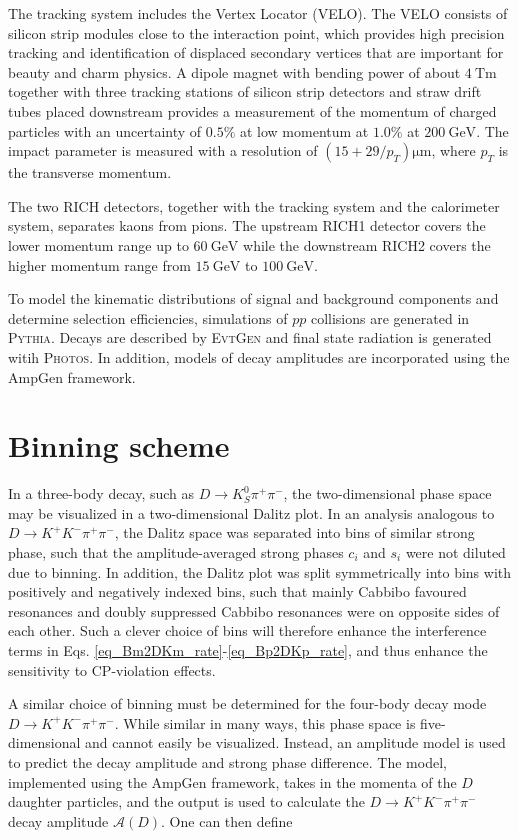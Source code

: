 \documentclass[12pt, a4paper, notitlepage, onecolumn]{article}
\def\pythia{\mbox{\textsc{Pythia}}\xspace}
\def\evtgen{\mbox{\textsc{EvtGen}}\xspace}
\def\photos{\mbox{\textsc{Photos}}\xspace}
\numberwithin{equation}{section}
\begin{document}
The tracking system includes the Vertex Locator (VELO). The VELO consists of silicon strip modules close to the interaction point, which provides high precision tracking and identification of displaced secondary vertices that are important for beauty and charm physics. A dipole magnet with bending power of about $\SI{4}{\tesla\meter}$ together with three tracking stations of silicon strip detectors and straw drift tubes placed downstream provides a measurement of the momentum of charged particles with an uncertainty of $0.5\%$ at low momentum at $1.0\%$ at $\SI{200}{\giga\eV}$. The impact parameter is measured with a resolution of $(15 + 29/p_T)\si{\micro\meter}$, where $p_T$ is the transverse momentum.

The two RICH detectors, together with the tracking system and the calorimeter system, separates kaons from pions. The upstream RICH1 detector covers the lower momentum range up to $\SI{60}{\giga\eV}$ while the downstream RICH2 covers the higher momentum range from $\SI{15}{\giga\eV}$ to $\SI{100}{\giga\eV}$.

To model the kinematic distributions of signal and background components and determine selection efficiencies, simulations of $pp$ collisions are generated in \pythia. Decays are described by \evtgen and final state radiation is generated witih \photos. In addition, models of decay amplitudes are incorporated using the AmpGen framework.

\section{Binning scheme}
\noindent In a three-body decay, such as $D\to K_S^0\pi^+\pi^-$, the two-dimensional phase space may be visualized in a two-dimensional Dalitz plot. In an analysis analogous to $D\to K^+K^-\pi^+\pi^-$, the Dalitz space was separated into bins of similar strong phase, such that the amplitude-averaged strong phases $c_i$ and $s_i$ were not diluted due to binning. In addition, the Dalitz plot was split symmetrically into bins with positively and negatively indexed bins, such that mainly Cabbibo favoured resonances and doubly suppressed Cabbibo resonances were on opposite sides of each other. Such a clever choice of bins will therefore enhance the interference terms in Eqs. \eqref{eq_Bm2DKm_rate}-\eqref{eq_Bp2DKp_rate}, and thus enhance the sensitivity to CP-violation effects.

A similar choice of binning must be determined for the four-body decay mode $D\to K^+K^-\pi^+\pi^-$. While similar in many ways, this phase space is five-dimensional and cannot easily be visualized. Instead, an amplitude model is used to predict the decay amplitude and strong phase difference. The model, implemented using the AmpGen framework, takes in the momenta of the $D$ daughter particles, and the output is used to calculate the $D\to K^+K^-\pi^+\pi^-$ decay amplitude $\mathcal{A}(D)$. One can then define
\end{document}
